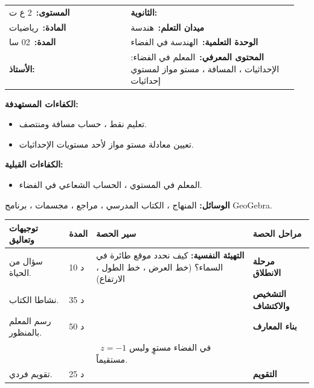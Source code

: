 \documentclass[12pt,a4paper]{article}
\makeatletter
\newenvironment{LTR}{\begin{otherlanguage}{english}}{\end{otherlanguage}}
\newcommand{\ar}[1]{\foreignlanguage{arabic}{#1}}
\newcommand{\Phase}[1]{\textbf{#1}}
\newcommand{\Fld}[2]{\textbf{#1:}\ #2}
\newcommand{\ModhHead}[9]{%
\begin{LTR}
\begin{tcolorbox}[enhanced,colback=white,colframe=cThm!85!black,arc=4mm,boxrule=1pt,top=14pt,bottom=6pt,left=8pt,right=8pt,
 overlay={\node[fill=cThm!85!black,text=white,rounded corners=3mm,inner xsep=14pt,inner ysep=4pt,font=\large\bfseries] at ([yshift=0pt]frame.north){\ar{مذكرة رقم #1}};},
 before upper={\selectlanguage{arabic}}]
\begin{tabular}{@{}p{0.4\linewidth}p{0.55\linewidth}@{}}
\Fld{المستوى}{#2} & \Fld{الثانوية}{\dotfill}\\[3pt]
\Fld{المادة}{رياضيات} & \Fld{ميدان التعلم}{#3}\\[3pt]
\Fld{المدة}{#5} & \Fld{الوحدة التعلمية}{#4}\\[3pt]
\Fld{الأستاذ}{\dotfill} & \Fld{المحتوى المعرفي}{#6}\\
\end{tabular}
\end{tcolorbox}
\begin{tcolorbox}[enhanced,colback=white,colframe=cThm!85!black,arc=3mm,boxrule=0.8pt,sidebyside,sidebyside align=top,lefthand ratio=0.5,
 segmentation style={dashed,cThm!60},before upper={\selectlanguage{arabic}},before lower={\selectlanguage{arabic}}]
\textbf{الكفاءات المستهدفة:}\par #8
\tcblower
\textbf{الكفاءات القبلية:}\par #7
\end{tcolorbox}
\end{LTR}
\par\smallskip\textbf{الوسائل:} #9\par\smallskip}
\newenvironment{Sayr}{%
\begin{LTR}\renewcommand{\arraystretch}{1.25}
\begin{longtable}{|p{0.17\textwidth}|>{\centering\arraybackslash}p{0.06\textwidth}|p{0.53\textwidth}|>{\centering\arraybackslash}p{0.12\textwidth}|}
\hline\rowcolor{cThm!12}\ar{\textbf{توجيهات وتعاليق}} & \ar{\textbf{المدة}} & \ar{\textbf{سير الحصة}} & \ar{\textbf{مراحل الحصة}}\\\hline\endhead
\hline\endfoot}{\end{longtable}\end{LTR}}
\newcommand{\Row}[4]{\ar{\small #4} & \ar{#3} & \ar{#2} & \cellcolor{cThm!8}\ar{\Phase{#1}}\\\hline}
\newcommand{\Lab}[2]{\foreignlanguage{english}{\tcbox[on line,colback=#1,colframe=#1,boxrule=0pt,arc=2pt,boxsep=1pt,left=5pt,right=5pt,top=1pt,bottom=1pt]{\ar{\textcolor{white}{\textbf{#2}}}}}}
\newcommand{\ck}{\ensuremath{{\color{cRem}\checkmark}}}
\makeatother
\begin{document}
\newpage
\ModhHead{69}{2 ع ت}{هندسة}{الهندسة في الفضاء}{02 سا}{المعلم في الفضاء: الإحداثيات ، المسافة ، مستو مواز لمستوي إحداثيات}%
{\begin{itemize}\item المعلم في المستوي ، الحساب الشعاعي في الفضاء.\end{itemize}}%
{\begin{itemize}\item تعليم نقط ، حساب مسافة ومنتصف.\item تعيين معادلة مستو مواز لأحد مستويات الإحداثيات.\end{itemize}}%
{المنهاج ، الكتاب المدرسي ، مراجع ، مجسمات ، برنامج GeoGebra.}
\begin{Sayr}
\Row{مرحلة الانطلاق}{%
\textbf{التهيئة النفسية:} كيف نحدد موقع طائرة في السماء؟ (خط العرض ، خط الطول ، الارتفاع)}{10 د}{سؤال من الحياة.}
\Row{التشخيص والاكتشاف}{%
\Lab{cEx}{مناقشة النشاطين 01 و 03 (أنشطة باب التعليم في الفضاء)}\par\ck\ إحداثيات رؤوس متوازي مستطيلات في معلم.\par
\ck\ حساب المسافة بتطبيق فيثاغورس في مثلثين قائمين.\par
}{35 د}{نشاطا الكتاب.}
\Row{بناء المعارف}{%
\Lab{cThm}{خاصية}\ في معلم متعامد ومتجانس $(O;\vec i,\vec j,\vec k)$:\par\ck\ $\overrightarrow{AB}(x_B-x_A;y_B-y_A;z_B-z_A)$ ؛ المنتصف $\left(\frac{x_A+x_B}2;\frac{y_A+y_B}2;\frac{z_A+z_B}2\right)$.\par
\ck\ $AB=\sqrt{(x_B-x_A)^2+(y_B-y_A)^2+(z_B-z_A)^2}$.\par
\ck\ المستوي الذي يشمل $A$ ويوازي $(xOy)$ معادلته $z=z_A$ (وبالمثل $x=x_A$ ، $y=y_A$).\par
\Lab{cEx}{مثال}\ $A(1;2;-1)$ ، $B(3;-2;3)$: $AB=\sqrt{4+16+16}=6$ ، المنتصف $(2;0;1)$ ؛ المستوي الذي يشمل $A$ ويوازي $(xOy)$: $z=-1$.\par}{50 د}{رسم المعلم بالمنظور.}
\Row{}{%
\Lab{cThm!80!black}{حذار}\ $z=-1$ في الفضاء مستوٍ وليس مستقيماً.}{}{}
\Row{التقويم}{%
\Lab{cEx}{تطبيق}\par $A(2;0;1)$ ، $B(0;2;1)$ ، $C(1;1;5)$. بيّن أن المثلث $ABC$ متساوي الساقين.\par\textbf{الحل:} $CA=\sqrt{1+1+16}=\sqrt{18}$ ، $CB=\sqrt{1+1+16}=\sqrt{18}$ ، $AB=\sqrt8$: متساوي الساقين رأسه $C$.\par\textbf{واجب منزلي:} تمارين من باب التعليم في الفضاء.\par\smallskip\textbf{ملاحظات حول سير الحصة:} \dotfill}{25 د}{تقويم فردي.}
\end{Sayr}
\end{document}
